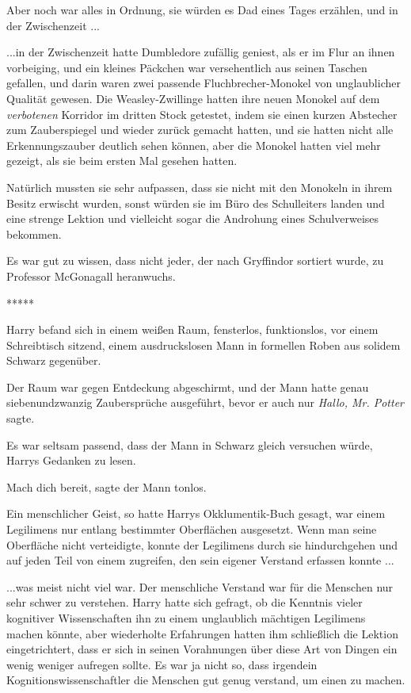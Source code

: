 Aber noch war alles in Ordnung, sie würden es Dad eines Tages erzählen, und in
der Zwischenzeit ...

...in der Zwischenzeit hatte Dumbledore zufällig geniest, als er im Flur an
ihnen vorbeiging, und ein kleines Päckchen war versehentlich aus seinen Taschen
gefallen, und darin waren zwei passende Fluchbrecher-Monokel von unglaublicher
Qualität gewesen. Die Weasley-Zwillinge hatten ihre neuen Monokel auf dem
\glqq{} \emph{verbotenen}\grqq{} Korridor im dritten Stock getestet, indem sie
einen kurzen Abstecher zum Zauberspiegel und wieder zurück gemacht hatten, und
sie hatten nicht alle Erkennungszauber deutlich sehen können, aber die Monokel
hatten viel mehr gezeigt, als sie beim ersten Mal gesehen hatten.

Natürlich mussten sie sehr aufpassen, dass sie nicht mit den Monokeln in ihrem
Besitz erwischt wurden, sonst würden sie im Büro des Schulleiters landen und
eine strenge Lektion und vielleicht sogar die Androhung eines Schulverweises
bekommen.

Es war gut zu wissen, dass nicht jeder, der nach Gryffindor sortiert wurde, zu
Professor McGonagall heranwuchs.

\begin{center}*****\end{center}

Harry befand sich in einem weißen Raum, fensterlos, funktionslos, vor einem
Schreibtisch sitzend, einem ausdruckslosen Mann in formellen Roben aus solidem
Schwarz gegenüber.

Der Raum war gegen Entdeckung abgeschirmt, und der Mann hatte genau
siebenundzwanzig Zaubersprüche ausgeführt, bevor er auch nur \emph{\glqq{}
Hallo, Mr. Potter\grqq{}} sagte.

Es war seltsam passend, dass der Mann in Schwarz gleich versuchen würde, Harrys
Gedanken zu lesen.

\glqq{}Mach dich bereit\grqq{}, sagte der Mann tonlos.

Ein menschlicher Geist, so hatte Harrys Okklumentik-Buch gesagt, war einem
Legilimens nur entlang bestimmter Oberflächen ausgesetzt. Wenn man seine
Oberfläche nicht verteidigte, konnte der Legilimens durch sie hindurchgehen und
auf jeden Teil von einem zugreifen, den sein eigener Verstand erfassen konnte ...

...was meist nicht viel war. Der menschliche Verstand war für die Menschen nur
sehr schwer zu verstehen. Harry hatte sich gefragt, ob die Kenntnis vieler
kognitiver Wissenschaften ihn zu einem unglaublich mächtigen Legilimens machen
könnte, aber wiederholte Erfahrungen hatten ihm schließlich die Lektion
eingetrichtert, dass er sich in seinen Vorahnungen über diese Art von Dingen ein
wenig weniger aufregen sollte. Es war ja nicht so, dass irgendein
Kognitionswissenschaftler die Menschen gut genug verstand, um einen zu machen.

